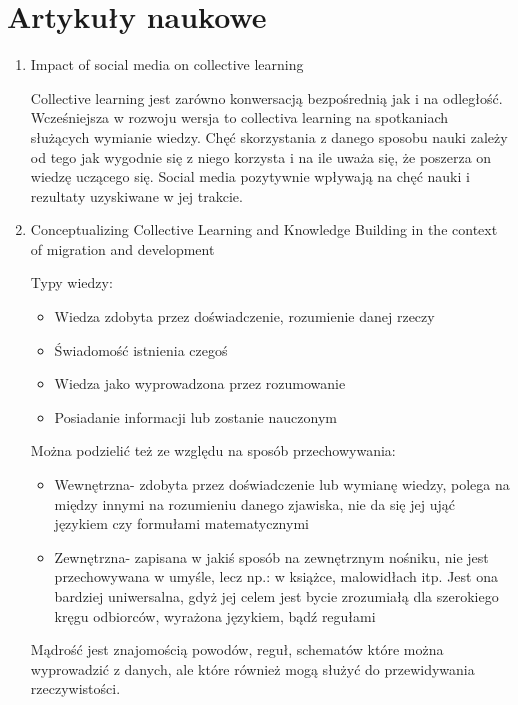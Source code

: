 \documentclass[11pt]{aghdpl}
\begin{document}
\section{Artykuły naukowe}
\begin{enumerate}

\item Impact of social media on collective learning \cite{ImpactOfSocialMediaOnCollectiveLearning}

Collective learning jest zarówno konwersacją bezpośrednią jak i na odległość. Wcześniejsza w rozwoju wersja to collectiva learning na spotkaniach służących wymianie wiedzy. Chęć skorzystania z danego sposobu nauki zależy od tego jak wygodnie się z niego korzysta i na ile uważa się, że poszerza on wiedzę uczącego się. Social media pozytywnie wpływają na chęć nauki i rezultaty uzyskiwane w jej trakcie.

\item Conceptualizing Collective Learning and Knowledge Building in the context of migration and development \cite{ConceptualizingCollectiveLearning}

Typy wiedzy:

\begin{itemize}
        \item Wiedza zdobyta przez doświadczenie, rozumienie danej rzeczy
        \item Świadomość istnienia czegoś
        \item Wiedza jako wyprowadzona przez rozumowanie
        \item Posiadanie informacji lub zostanie nauczonym
\end{itemize}

Można podzielić też ze względu na sposób przechowywania:

\begin{itemize}
        \item Wewnętrzna- zdobyta przez doświadczenie lub wymianę wiedzy, polega na między innymi na rozumieniu danego zjawiska, nie da się jej ująć językiem czy formułami matematycznymi
        \item Zewnętrzna- zapisana w jakiś sposób na zewnętrznym nośniku, nie jest przechowywana w umyśle, lecz np.: w książce, malowidłach itp. Jest ona bardziej uniwersalna, gdyż jej celem jest bycie zrozumiałą dla szerokiego kręgu odbiorców, wyrażona językiem, bądź regułami
\end{itemize}

Mądrość jest znajomością powodów, reguł, schematów które można wyprowadzić z danych, ale które również mogą służyć do przewidywania rzeczywistości.


\end{enumerate}
\end{document}
